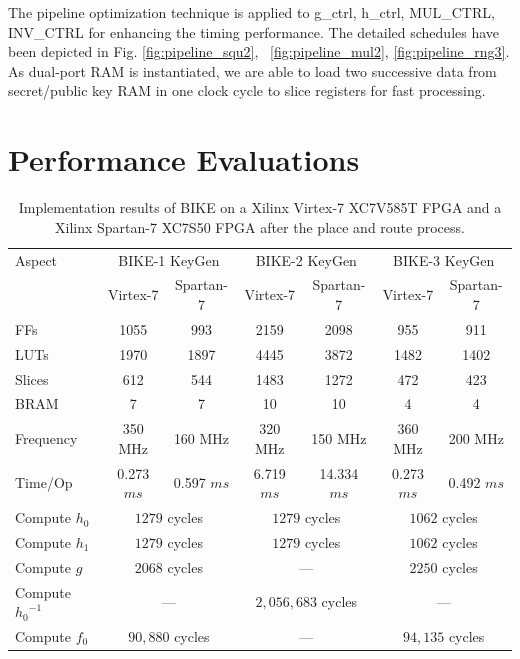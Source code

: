 \documentclass[preprint]{iacrtrans}
\begin{document}
 The pipeline optimization technique is applied to g\_ctrl, h\_ctrl, MUL\_CTRL, INV\_CTRL for enhancing the timing performance. The detailed schedules have been depicted in Fig. \ref{fig:pipeline_squ2}, ~\ref{fig:pipeline_mul2}, \ref{fig:pipeline_rng3}. As dual-port RAM is instantiated, we are able to load two successive data from secret/public key RAM in one clock cycle to slice registers for fast processing.

\section{Performance Evaluations}
\begin{table}[!t]\centering
 \caption{Implementation results of BIKE on a Xilinx Virtex-7 XC7V585T FPGA and a Xilinx Spartan-7 XC7S50 FPGA after the place and route process.}
 \label{table:expresult}\centering
 \begin{minipage}{\textwidth}\centering
  \begin{tabular}{lcccccc}
   \hline
   Aspect & \multicolumn{2}{c}{BIKE-1 KeyGen} & \multicolumn{2}{c}{BIKE-2 KeyGen} & \multicolumn{2}{c}{BIKE-3 KeyGen}\\
    & Virtex-7 & Spartan-7  & Virtex-7 & Spartan-7  & Virtex-7 & Spartan-7\\
   \hline
   FFs &1055   &993  &2159 &2098 &955 &911\\
   LUTs & 1970  &1897  &4445 &3872&1482&1402  \\
   Slices& 612 &544  &1483 &1272&472&423  \\
   BRAM & 7  &7  &10 & 10& 4&4\\
   \hline
   Frequency &  350 MHz  & 160 MHz &320 MHz & 150 MHz  & 360 MHz & 200 MHz\\
   Time/Op &  0.273 $ms$ &  0.597 $ms$ & 6.719 $ms$& 14.334 $ms$ &0.273 $ms$  & 0.492 $ms$\\
   \hline
   Compute $h_0$ & \multicolumn{2}{c}{$1279$ cycles} & \multicolumn{2}{c}{$1279$ cycles}  & \multicolumn{2}{c}{$1062$ cycles}\\
   Compute $h_1$& \multicolumn{2}{c}{$1279$ cycles} & \multicolumn{2}{c}{$1279$ cycles} & \multicolumn{2}{c}{$1062$ cycles}\\
   Compute $g$ & \multicolumn{2}{c}{$2068$ cycles} & \multicolumn{2}{c}{---} & \multicolumn{2}{c}{$2250$ cycles}\\
   Compute ${h_0}^{-1}$ & \multicolumn{2}{c}{---} & \multicolumn{2}{c}{$2,056,683$ cycles} &\multicolumn{2}{c}{---}\\
   Compute $f_0$ & \multicolumn{2}{c}{$90,880$ cycles} & \multicolumn{2}{c}{---} &\multicolumn{2}{c}{$94,135$ cycles}\\

\end{tabular}
\end{minipage}
\end{table}
\end{document}
